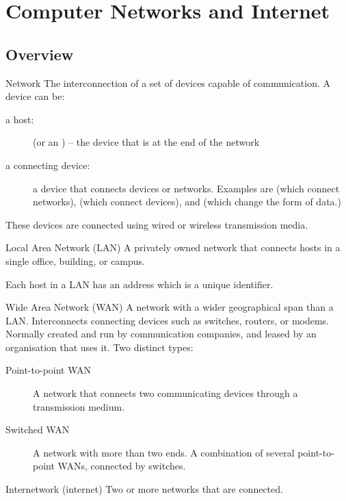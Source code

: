 \documentclass[\main/notes.tex]{subfiles}
\begin{document}
	\setcounter{chapter}{5}
	\chapter{Computer Networks and Internet}
		\section{Overview}
			\begin{definition}{Network}
				The interconnection of a set of devices capable of communication. A device can be:
				\begin{indentparagraph}
					\begin{description}
						\item[a host:] (or an ) -- the device that is at the end of the network
						\item[a connecting device:] a device that connects devices or networks.
							Examples are  (which connect networks),  (which connect devices), and  (which change the form of data.)
					\end{description}
				\end{indentparagraph}
				These devices are connected using wired or wireless transmission media.
			\end{definition}
			\begin{definition}{Local Area Network (LAN)}
				A privately owned network that connects hosts in a single office, building, or campus.

				Each host in a LAN has an address which is a unique identifier.
			\end{definition}
			\begin{definition}{Wide Area Network (WAN)}
				A network with a wider geographical span than a LAN. Interconnects connecting devices such as switches, routers, or modems. Normally created and run by communication companies, and leased by an organisation that uses it. Two distinct types:
				\begin{indentparagraph}
					\begin{description}
						\item[Point-to-point WAN] A network that connects two communicating devices through a transmission medium.
						\item[Switched WAN] A network with more than two ends. A combination of several point-to-point WANs, connected by switches.  
					\end{description}
				\end{indentparagraph}
			\end{definition}
			\begin{definition}{Internetwork (internet)}
				Two or more networks that are connected.
			\end{definition}
\end{document}
